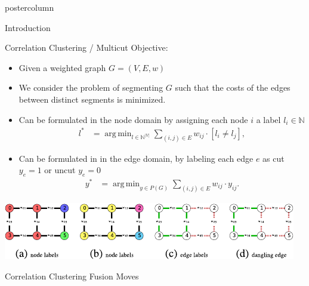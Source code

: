 \documentclass[final,hyperref={pdfpagelabels=false}]{beamer}
\DeclareMathOperator*{\argmin}{arg\,min}
\begin{document}
\begin{frame}
\begin{columns}
\begin{column}{.49\textwidth}
\begin{beamercolorbox}[center,wd=\textwidth]{postercolumn}
\begin{minipage}[T]{.95\textwidth}
{\begin{block}{Introduction}
            \end{block}
            \vfill
            \begin{block}{Correlation Clustering / Multicut Objective:}
            \begin{small}
            \begin{itemize}
            \item Given a weighted graph $G=(V,E,w)$ 
            \item We consider the problem of segmenting $G$ such that the costs
            of the edges between distinct segments is minimized. 
            \item Can be formulated in the node domain
            by assigning each node $i$ a label $l_i \in \mathbb{N}$
            \begin{align}
              l^* &= \argmin_{l \in \mathbb{N}^{|V|}} \sum_{ (i,j) \in E } w_{ij} \cdot [l_{i} \neq l_{j}], \label{eq:nodeproblem}
            \end{align} 
            \item Can be formulated in in the edge domain, by labeling each edge $e$ as cut $y_e=1$ or uncut $y_e=0$ 
            \begin{align}
              y^* &= \argmin_{y \in P(G)} \sum_{ (i,j) \in E } w_{ij} \cdot y_{ij} \label{eq:edgeproblem}.%
            \end{align}
            \end{itemize}
            \centering
            \includegraphics[width=0.9\linewidth]{ne-crop.pdf}
            \end{small}

            \end{block}



            \vfill
            \begin{block}{Correlation Clustering Fusion Moves}
              \begin{small}

              \begin{itemize}


\end{itemize}
\end{small}
\end{block}}
\end{minipage}
\end{beamercolorbox}
\end{column}
\end{columns}
\end{frame}
\end{document}
